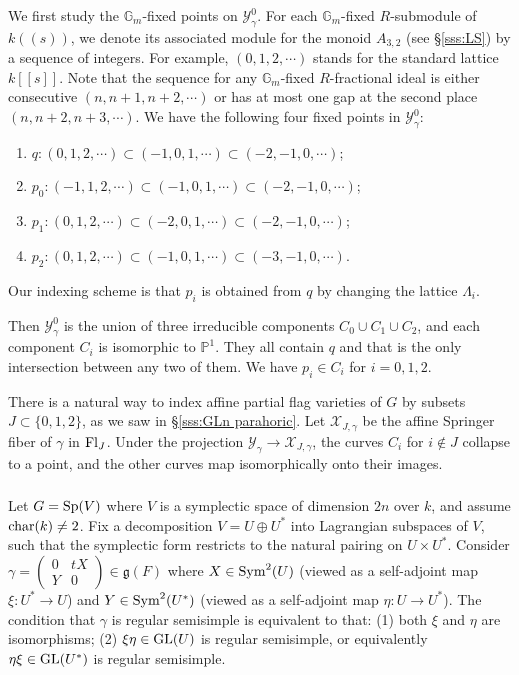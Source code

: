 \documentclass[]{pcmi}
\let\oldsubsubsection\subsubsection
\renewcommand{\subsubsection}[1]{%
\setcounter{subsubsection}{\value{equation}}%
\oldsubsubsection{#1}%
\refstepcounter{equation}%
}
\theoremstyle{plain}
\theoremstyle{definition}
\def\GG{\mathbb{G}}
\def\PP{\mathbb{P}}
\newcommand{\sX}{\ensuremath{\mathscr{X}}\xspace}
\newcommand{\sY}{\ensuremath{\mathscr{Y}}\xspace}
\newcommand{\sX}{\ensuremath{\mathcal{X}}\xspace}
\newcommand{\sY}{\ensuremath{\mathcal{Y}}\xspace}
\newcommand\frg{\mathfrak{g}}
\newcommand{\Fl}{\textup{Fl}}
\newcommand\Sym{\textup{Sym}}
\newcommand\GL{\textup{GL}}
\newcommand\Sp{\textup{Sp}}
\newcommand{\Gm}{\GG_m}
\renewcommand{\L}{\Lambda}
\newcommand\mat[4]{\left(\begin{array}{cc} #1 & #2 \\ #3 & #4 \end{array}\right)}  %
\newcommand\chark{\textup{char}(k)}
\newcommand{\tl}[1]{[\![#1]\!]}
\newcommand{\lr}[1]{(\!(#1)\!)}
\begin{document}
We first study the $\Gm$-fixed points on $\sY^{0}_{\gamma}$. For each $\Gm$-fixed $R$-submodule of $k\lr{s}$, we denote its associated module for the monoid $A_{3,2}$ (see \S\ref{sss:LS}) by a sequence of integers. For example, $(0,1,2,\cdots)$ stands for the standard lattice $k\tl{s}$. Note that the sequence for any $\Gm$-fixed $R$-fractional ideal is either consecutive $(n,n+1,n+2,\cdots)$ or has at most one gap at the second place $(n,n+2,n+3,\cdots)$. We have the following four fixed points in $\sY^{0}_{\gamma}$:
\begin{enumerate}
\item $q: (0,1,2,\cdots)\subset (-1,0,1,\cdots)\subset (-2,-1,0,\cdots)$;
\item $p_{0}: (-1,1,2,\cdots)\subset (-1,0,1,\cdots)\subset (-2,-1,0,\cdots)$;
\item $p_{1}: (0,1,2,\cdots)\subset (-2,0,1,\cdots)\subset (-2,-1,0,\cdots)$;
\item $p_{2}:(0,1,2,\cdots)\subset (-1,0,1,\cdots)\subset (-3,-1,0,\cdots)$. 
\end{enumerate}
Our indexing scheme is that $p_{i}$ is obtained from $q$ by changing the lattice $\L_{i}$. 

Then $\sY^{0}_{\gamma}$ is the union of three irreducible components $C_{0}\cup C_{1}\cup C_{2}$, and each component $C_{i}$ is isomorphic to $\PP^{1}$. They all contain $q$ and that is the only intersection between any two of them. We have $p_{i}\in C_{i}$ for $i=0,1,2$.

There is a natural way to index affine partial flag varieties  of $G$ by subsets $J\subset \{0,1,2\}$, as we saw in \S\ref{sss:GLn parahoric}. Let $\sX_{J,\gamma}$ be the affine Springer fiber of $\gamma$ in $\Fl_{J}$. Under the projection $\sY_{\gamma}\to \sX_{J,\gamma}$, the curves $C_{i}$ for $i\notin J$ collapse to a point, and the other curves map isomorphically onto their images.



\subsubsection{}\label{ex:Sp} Let $G=\Sp(V)$ where $V$ is a symplectic space of dimension $2n$ over $k$, and assume $\chark\neq2$. Fix a decomposition $V=U\oplus U^{*}$ into Lagrangian subspaces of $V$, such that the symplectic form restricts to the natural pairing on $U\times U^{*}$. Consider $\gamma=\mat{0}{tX}{Y}{0}\in\frg(F)$ where $X\in\Sym^{2}(U)$ (viewed as a self-adjoint map $\xi:U^{*}\to U$) and $Y\in\Sym^{2}(U^{*})$ (viewed as a self-adjoint map $\eta:U\to U^{*}$). The condition that $\gamma$ is regular semisimple is equivalent to that: (1) both $\xi$ and $\eta$ are isomorphisms; (2) $\xi\eta\in\GL(U)$ is regular semisimple, or equivalently $\eta\xi\in\GL(U^{*})$ is regular semisimple.
\end{document}
